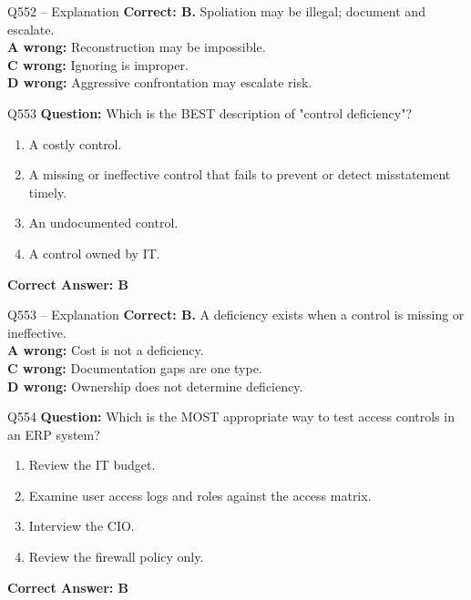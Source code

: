 \documentclass[aspectratio=169,10pt]{beamer}
\begin{document}
	\begin{frame}[t]{Q552 -- Explanation}
		\small
		\textbf{Correct: B.} Spoliation may be illegal; document and escalate. \\[4pt]
		\textbf{A wrong:} Reconstruction may be impossible. \\[2pt]
		\textbf{C wrong:} Ignoring is improper. \\[2pt]
		\textbf{D wrong:} Aggressive confrontation may escalate risk.
	\end{frame}
	
	\begin{frame}[t]{Q553}
		\small
		\textbf{Question:} Which is the BEST description of "control deficiency"?
		\begin{enumerate}[label=\Alph*.,itemsep=1pt,topsep=2pt]
			\item A costly control.
			\item A missing or ineffective control that fails to prevent or detect misstatement timely.
			\item An undocumented control.
			\item A control owned by IT.
		\end{enumerate}
		\vspace{4pt}
		\textbf{Correct Answer: B}
	\end{frame}
	
	\begin{frame}[t]{Q553 -- Explanation}
		\small
		\textbf{Correct: B.} A deficiency exists when a control is missing or ineffective. \\[4pt]
		\textbf{A wrong:} Cost is not a deficiency. \\[2pt]
		\textbf{C wrong:} Documentation gaps are one type. \\[2pt]
		\textbf{D wrong:} Ownership does not determine deficiency.
	\end{frame}
	
	\begin{frame}[t]{Q554}
		\small
		\textbf{Question:} Which is the MOST appropriate way to test access controls in an ERP system?
		\begin{enumerate}[label=\Alph*.,itemsep=1pt,topsep=2pt]
			\item Review the IT budget.
			\item Examine user access logs and roles against the access matrix.
			\item Interview the CIO.
			\item Review the firewall policy only.
		\end{enumerate}
		\vspace{4pt}
		\textbf{Correct Answer: B}
	\end{frame}
	
\end{document}
